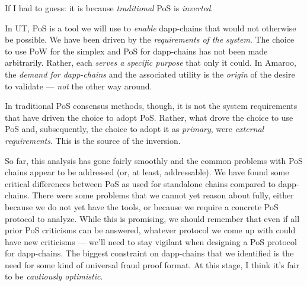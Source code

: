 If I had to guess: it is because \emph{traditional} PoS is \emph{inverted}.

In UT, PoS is a tool we will use to \emph{enable} dapp-chains that would not otherwise be possible.
We have been driven by the \emph{requirements of the system}.
The choice to use PoW for the simplex and PoS for dapp-chains has not been made arbitrarily.
Rather, each \emph{serves a specific purpose} that only it could.
In Amaroo, the \emph{demand for dapp-chains} and the associated utility is the \emph{origin} of the desire to validate --- \emph{not} the other way around.

In traditional PoS consensus methods, though, it is not the system requirements that have driven the choice to adopt PoS.
Rather, what drove the choice to use PoS and, subsequently, the choice to adopt it as \emph{primary}, were \emph{external requirements}.
This is the source of the inversion.



So far, this analysis has gone fairly smoothly and the common problems with PoS chains appear to be addressed (or, at least, addressable).
We have found some critical differences between PoS as used for standalone chains compared to dapp-chains.
There were some problems that we cannot yet reason about fully, either because we do not yet have the tools, or because we require a concrete PoS protocol to analyze.
While this is promising, we should remember that even if all prior PoS criticisms can be answered, whatever protocol we come up with could have new criticisms --- we'll need to stay vigilant when designing a PoS protocol for dapp-chains.
The biggest constraint on dapp-chains that we identified is the need for some kind of universal fraud proof format.
At this stage, I think it's fair to be \emph{cautiously optimistic}.








